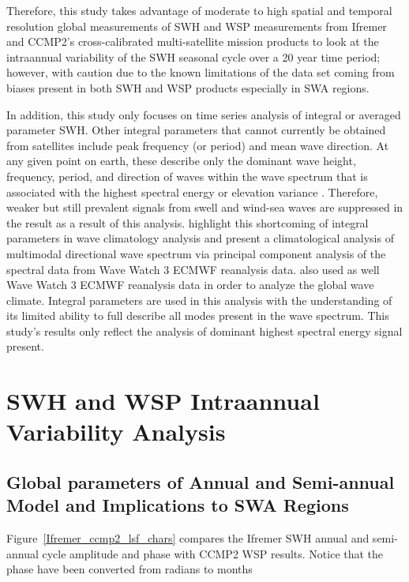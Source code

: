 \documentclass[draft,linenumbers]{agujournal2018}
\begin{document}
Therefore, this study takes advantage of moderate to high spatial and temporal resolution global measurements of SWH and WSP measurements from Ifremer and CCMP2's cross-calibrated multi-satellite mission products to look at the intraannual variability of the SWH seasonal cycle over a 20 year time period; however, with caution due to the known limitations of the data set coming from biases present in both SWH and WSP products especially in SWA regions.


In addition, this study only focuses on time series analysis of integral or averaged parameter SWH. Other integral parameters that cannot currently be obtained from satellites include peak frequency (or period) and mean wave direction. At any given point on earth, these describe only the dominant wave height, frequency, period, and direction of waves within the wave spectrum that is associated with the highest spectral energy or elevation variance \cite{ardhuin2015ocean}. Therefore, weaker but still prevalent signals from swell and wind-sea waves are suppressed in the result as a result of this analysis. \citet{echevarria2019seasonal} highlight this shortcoming of integral parameters in wave climatology analysis and present a climatological analysis of multimodal directional wave spectrum via principal component analysis of the spectral data from Wave Watch 3 ECMWF reanalysis data. \citet{semedo2011global} also used as well Wave Watch 3 ECMWF reanalysis data in order to analyze the global wave climate. Integral parameters are used in this analysis with the understanding of its limited ability to full describe all modes present in the wave spectrum. This study's results only reflect the analysis of dominant highest spectral energy signal present.

\section{SWH and WSP Intraannual Variability Analysis}

\subsection{Global parameters of Annual and Semi-annual Model and Implications to SWA Regions}

Figure~\ref{Ifremer_ccmp2_lsf_chars} compares the Ifremer SWH annual and semi-annual cycle amplitude and phase with CCMP2 WSP results. Notice that the phase have been converted from radians to months 
\end{document}
